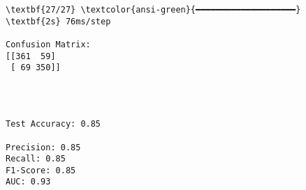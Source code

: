 \documentclass[11pt]{article}
\begin{document}
    \begin{Verbatim}[commandchars=\\\{\}]
\textbf{27/27} \textcolor{ansi-green}{━━━━━━━━━━━━━━━━━━━━} \textbf{2s} 76ms/step

Confusion Matrix:
[[361  59]
 [ 69 350]]
    \end{Verbatim}

    \begin{center}
    \end{center}
    { \hspace*{\fill} \\}
    
    \begin{Verbatim}[commandchars=\\\{\}]

Test Accuracy: 0.85

Precision: 0.85
Recall: 0.85
F1-Score: 0.85
AUC: 0.93
    \end{Verbatim}

    \begin{center}
    \end{center}
    { \hspace*{\fill} \\}
    

    
    
    
\end{document}

